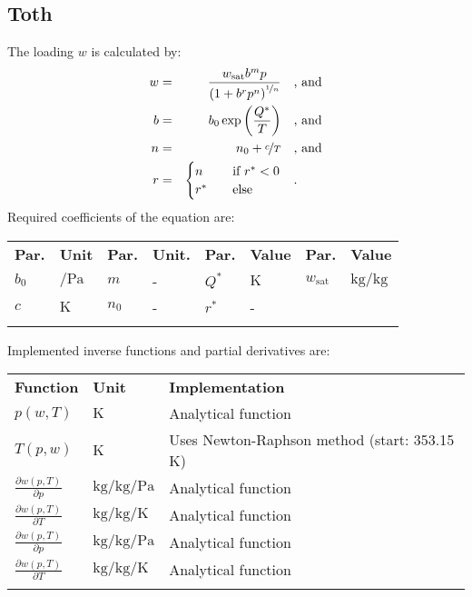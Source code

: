 \subsection{Toth}
\label{cha:approaches:ads:sur:toth}
%
The loading $w$ is calculated by:
%
\begin{equation*}
	\begin{split}
		w &=& \frac{w_\mathrm{sat} b^{m} p}{\left( 1 + b^{r} p^{n} \right)^{\nicefrac{1}{n}}} & \quad\text{, and} \\
		b &=& b_0 \exp\left( \frac{Q^{*}}{T} \right) & \quad\text{, and} \\
		n &=& n_0 + \nicefrac{c}{T} & \quad\text{, and} \\
		r &=& \begin{cases} n & \quad \text{if } r^{*} < 0 \\ r^{*}  & \quad \text{else} \end{cases} & \quad\text{.}
	\end{split}
\end{equation*}
%
Required coefficients of the equation are:
%
\begin{longtable}[l]{ll|ll|ll|ll}
\toprule
\addlinespace
\textbf{Par.} & \textbf{Unit} & \textbf{Par.} &	\textbf{Unit.} & \textbf{Par.} & \textbf{Value} & \textbf{Par.} & \textbf{Value} \\
\addlinespace
\midrule
\endhead

\bottomrule
\endfoot
\bottomrule
\endlastfoot
\addlinespace

$b_0$ & $\si{\per\pascal}$ & $m$ & - & $Q^{*}$ & $\si{\kelvin}$ & $w_\mathrm{sat}$ & $\si{\kilogram\per\kilogram}$ \\
$c$ & $\si{\kelvin}$ & $n_0$ & - & $r^{*}$ & - &  &  \\

\addlinespace
\end{longtable}
%
Implemented inverse functions and partial derivatives are:
%
\begin{longtable}[l]{l|l|p{7.5cm}}
	\toprule
	\addlinespace
	\textbf{Function} & \textbf{Unit} &	\textbf{Implementation} \\
	\addlinespace
	\midrule
	\endhead
	
	\bottomrule
	\endfoot
	\bottomrule
	\endlastfoot
	\addlinespace
	
	$p(w,T)$	& $\si{\kelvin}$ & Analytical function\\
	$T(p,w)$	& $\si{\kelvin}$ & Uses Newton-Raphson method (start: 353.15 K) \\
	$\frac{\partial w(p,T)}{\partial p}$	& $\si{\kilogram\per\kilogram\per\pascal}$ & Analytical function\\
	$\frac{\partial w(p,T)}{\partial T}$	& $\si{\kilogram\per\kilogram\per\kelvin}$ & Analytical function\\
	$\frac{\partial w(p,T)}{\partial p}$	& $\si{\kilogram\per\kilogram\per\pascal}$ & Analytical function\\
	$\frac{\partial w(p,T)}{\partial T}$	& $\si{\kilogram\per\kilogram\per\kelvin}$ & Analytical function\\
	
	\addlinespace
\end{longtable}
